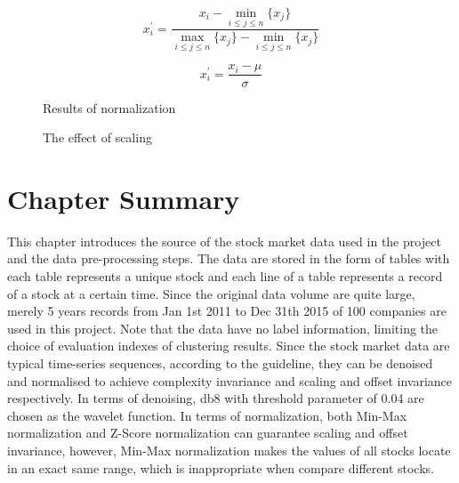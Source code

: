 \begin{equation}
    x_i^{\prime} = \frac{x_i - \min_{i\leq j \leq n} \{x_j\}}{\max_{i\leq j \leq n} \{x_j\} - \min_{i\leq j \leq n} \{x_j\} }
    \label{equ:minmax}
\end{equation}

\begin{equation}
    x_i^{\prime} = \frac{x_i - \mu}{\sigma}
    \label{equ:zerosmean}
\end{equation}

\begin{figure}[!htbp]
    \centering 
    \caption{ Results of normalization } 
    \label{fig:normalization1} 
\end{figure} 
\begin{figure}[!htbp]
    \centering 
    \caption{ The effect of scaling } 
    \label{fig:scaling1} 
\end{figure} 

\section{Chapter Summary}
This chapter introduces the source of the stock market data used in the project and the data pre-processing steps. The data are stored in the form of tables with each table represents a unique stock and each line of a table represents a record of a stock at a certain time. Since the original data volume are quite large, merely 5 years records from Jan 1st 2011 to Dec 31th 2015 of 100 companies are used in this project. Note that the data have no label information, limiting the choice of evaluation indexes of clustering results. Since the stock market data are typical time-series sequences, according to the guideline, they can be denoised and normalised to achieve complexity invariance and scaling and offset invariance respectively. In terms of denoising, db8 with threshold parameter of 0.04 are chosen as the wavelet function. In terms of normalization, both Min-Max normalization and Z-Score normalization can guarantee scaling and offset invariance, however, Min-Max normalization makes the values of all stocks locate in an exact same range, which is inappropriate when compare different stocks.